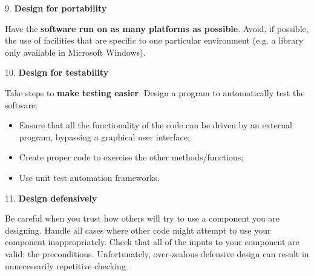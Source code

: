 \begin{flushleft}
    \large
    \textcolor{Red3}{9. \textbf{Design for portability}}
\end{flushleft}
Have the \textbf{software run on as many platforms as possible}. Avoid, if possible, the use of facilities that are specific to one particular environment (e.g. a library only available in Microsoft Windows).

\begin{flushleft}
    \large
    \textcolor{Red3}{10. \textbf{Design for testability}}
\end{flushleft}
Take steps to \textbf{make testing easier}. Design a program to automatically test the software:
\begin{itemize}
    \item Ensure that all the functionality of the code can be driven by an external program, bypassing a graphical user interface;
    \item Create proper code to exercise the other methods/functions;
    \item Use unit test automation frameworks.
\end{itemize}

\begin{flushleft}
    \large
    \textcolor{Red3}{11. \textbf{Design defensively}}
\end{flushleft}
Be careful when you trust how others will try to use a component you are designing. Handle all cases where other code might attempt to use your component inappropriately. Check that all of the inputs to your component are valid: the preconditions. Unfortunately, over-zealous defensive design can result in unnecessarily repetitive checking.